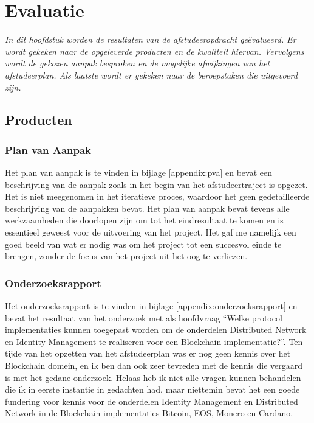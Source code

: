 \chapter{Evaluatie}

\textit{In dit hoofdstuk worden de resultaten van de afstudeeropdracht geëvalueerd. Er wordt gekeken naar de opgeleverde producten en de kwaliteit hiervan. Vervolgens wordt de gekozen aanpak besproken en de mogelijke afwijkingen van het afstudeerplan. Als laatste wordt er gekeken naar de beroepstaken die uitgevoerd zijn.}

\section{Producten}

\subsection{Plan van Aanpak}

Het plan van aanpak is te vinden in bijlage \ref{appendix:pva} en bevat een beschrijving van de aanpak zoals in het begin van het afstudeertraject is opgezet. Het is niet meegenomen in het iteratieve proces, waardoor het geen gedetailleerde beschrijving van de aanpakken bevat. Het plan van aanpak bevat tevens alle werkzaamheden die doorlopen zijn om tot het eindresultaat te komen en is essentieel geweest voor de uitvoering van het project. Het gaf me namelijk een goed beeld van wat er nodig was om het project tot een succesvol einde te brengen, zonder de focus van het project uit het oog te verliezen.

\subsection{Onderzoeksrapport}

Het onderzoeksrapport is te vinden in bijlage \ref{appendix:onderzoeksrapport} en bevat het resultaat van het onderzoek met als hoofdvraag ``Welke protocol implementaties kunnen toegepast worden om de onderdelen Distributed Network en Identity Management te realiseren voor een Blockchain implementatie?''. Ten tijde van het opzetten van het afstudeerplan was er nog geen kennis over het Blockchain domein, en ik ben dan ook zeer tevreden met de kennis die vergaard is met het gedane onderzoek. Helaas heb ik niet alle vragen kunnen behandelen die ik in eerste instantie in gedachten had, maar niettemin bevat het een goede fundering voor kennis voor de onderdelen Identity Management en Distributed Network in de Blockchain implementaties Bitcoin, EOS, Monero en Cardano. 


